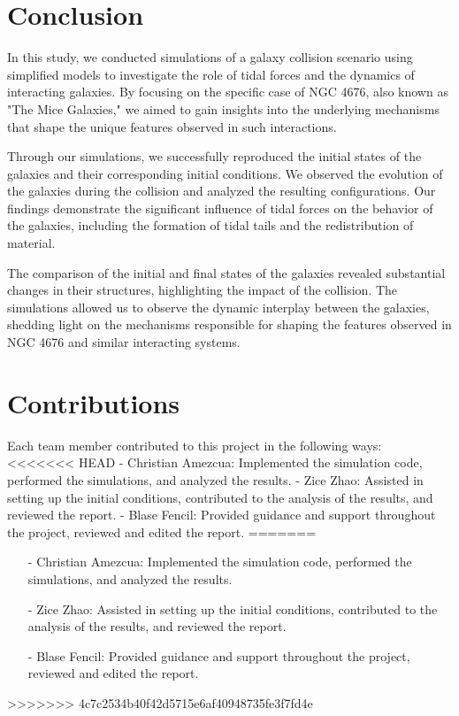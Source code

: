 \documentclass[reprint, amsmath, amssymb, aps]{revtex4-2}
\begin{document}
\section{Conclusion}

In this study, we conducted simulations of a galaxy collision scenario using simplified models to investigate the role of tidal forces and the dynamics of interacting galaxies. By focusing on the specific case of NGC 4676, also known as "The Mice Galaxies," we aimed to gain insights into the underlying mechanisms that shape the unique features observed in such interactions.

Through our simulations, we successfully reproduced the initial states of the galaxies and their corresponding initial conditions. We observed the evolution of the galaxies during the collision and analyzed the resulting configurations. Our findings demonstrate the significant influence of tidal forces on the behavior of the galaxies, including the formation of tidal tails and the redistribution of material.

The comparison of the initial and final states of the galaxies revealed substantial changes in their structures, highlighting the impact of the collision. The simulations allowed us to observe the dynamic interplay between the galaxies, shedding light on the mechanisms responsible for shaping the features observed in NGC 4676 and similar interacting systems.

\section{Contributions}

Each team member contributed to this project in the following ways:
<<<<<<< HEAD
- Christian Amezcua: Implemented the simulation code, performed the simulations, and analyzed the results.
- Zice Zhao: Assisted in setting up the initial conditions, contributed to the analysis of the results, and reviewed the report.
- Blase Fencil: Provided guidance and support throughout the project, reviewed and edited the report.
=======
\begin{itemize}
    \item[-] Christian Amezcua: Implemented the simulation code, performed the simulations, and analyzed the results.
    \item[-] Zice Zhao: Assisted in setting up the initial conditions, contributed to the analysis of the results, and reviewed the report.
    \item[-] Blase Fencil: Provided guidance and support throughout the project, reviewed and edited the report.
\end{itemize}
>>>>>>> 4c7c2534b40f42d5715e6af40948735fe3f7fd4e

\appendix


\end{document}
